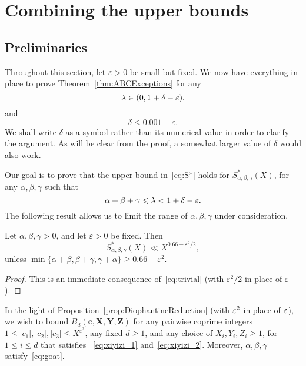 \chapter{Combining the upper bounds }

\section{Preliminaries}

Throughout this section, let $\varepsilon>0$ be small but fixed.
We now have everything in place to prove Theorem~\ref{thm:ABCExceptions} for any
\[
\lambda\in (0,1+\delta-\varepsilon).
\]
and
\[\delta\le 0.001-\varepsilon.\]
We shall write $\delta$ as a symbol rather than its numerical value
in order to clarify the argument. As will be clear from the proof, a somewhat larger value of $\delta$ would also work.

Our goal is to prove that the upper bound in~\eqref{eq:S*} holds for $S^{*}_{\alpha,\beta,\gamma}(X)$,
for any $\alpha,\beta,\gamma$ such that
\begin{equation}\label{eq:goat}
\alpha+\beta+\gamma\leqslant \lambda < 1+\delta -\varepsilon.
\end{equation}
The following result allows us to limit the range of $\alpha,\beta,\gamma$ under consideration.

\begin{proposition}\label{prop:simple}
Let $\alpha,\beta,\gamma>0$, and let $\varepsilon>0$ be fixed. Then
\[
S^*_{\alpha,\beta,\gamma}(X)\ll X^{0.66-\varepsilon^2/2},
\]
unless $\min\{\alpha+\beta, \beta+\gamma,\gamma+\alpha\}\geq 0.66-\varepsilon^2$.
\end{proposition}

\begin{proof}
This is an immediate consequence of~\eqref{eq:trivial} (with $\varepsilon^2/2$ in place of $\varepsilon$).
\end{proof}


In the light of Proposition~\ref{prop:DiophantineReduction} (with $\varepsilon^2$ in place of $\varepsilon$), we wish to bound $B_d(\mathbf{c},\mathbf{X},\mathbf{Y},\mathbf{Z})$ for any
 pairwise coprime integers $1\leq |c_1|,|c_2|,|c_3|\leq X^{\varepsilon^2}$, any fixed $d\geq 1$,
 and any choice of
 $X_i,Y_i,Z_i\geq 1$, for $1\leq i\leq d$ that satisfies
~\eqref{eq:xiyizi_1} and~\eqref{eq:xiyizi_2}.
 Moreover,
 $
 \alpha,\beta,\gamma
 $ satisfy~\eqref{eq:goat}.

